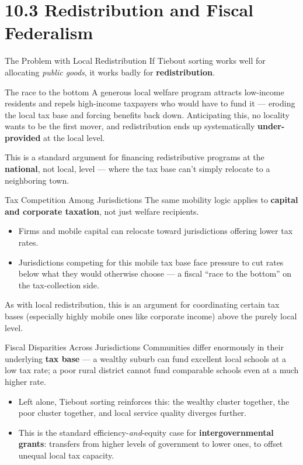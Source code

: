 \documentclass[11pt,aspectratio=169]{beamer}
\begin{document}
\section{10.3 Redistribution and Fiscal Federalism}

\begin{frame}{The Problem with Local Redistribution}
  If Tiebout sorting works well for allocating \emph{public goods}, it works badly for \textbf{redistribution}.
  \begin{alertblock}{The race to the bottom}
    A generous local welfare program attracts low-income residents and repels high-income taxpayers who would have to fund it --- eroding the local tax base and forcing benefits back down. Anticipating this, no locality wants to be the first mover, and redistribution ends up systematically \textbf{under-provided} at the local level.
  \end{alertblock}
  \small This is a standard argument for financing redistributive programs at the \textbf{national}, not local, level --- where the tax base can't simply relocate to a neighboring town.
\end{frame}

\begin{frame}{Tax Competition Among Jurisdictions}
  The same mobility logic applies to \textbf{capital and corporate taxation}, not just welfare recipients.
  \begin{itemize}
    \item Firms and mobile capital can relocate toward jurisdictions offering lower tax rates.
    \item Jurisdictions competing for this mobile tax base face pressure to cut rates below what they would otherwise choose --- a fiscal ``race to the bottom'' on the tax-collection side.
  \end{itemize}
  \small As with local redistribution, this is an argument for coordinating certain tax bases (especially highly mobile ones like corporate income) above the purely local level.
\end{frame}

\begin{frame}{Fiscal Disparities Across Jurisdictions}
  Communities differ enormously in their underlying \textbf{tax base} --- a wealthy suburb can fund excellent local schools at a low tax rate; a poor rural district cannot fund comparable schools even at a much higher rate.
  \begin{itemize}
    \item Left alone, Tiebout sorting reinforces this: the wealthy cluster together, the poor cluster together, and local service quality diverges further.
    \item This is the standard efficiency-\emph{and}-equity case for \textbf{intergovernmental grants}: transfers from higher levels of government to lower ones, to offset unequal local tax capacity.
  \end{itemize}
\end{frame}
\end{document}
